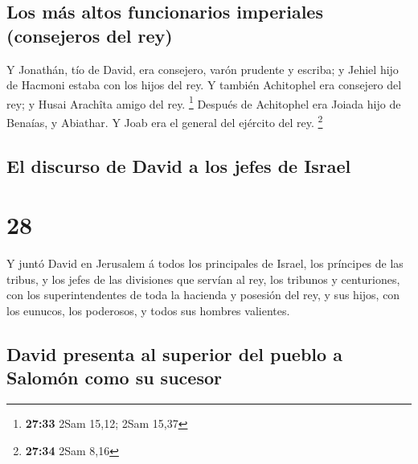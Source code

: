 \hypertarget{los-muxe1s-altos-funcionarios-imperiales-consejeros-del-rey}{%
\subsection{Los más altos funcionarios imperiales (consejeros del
rey)}\label{los-muxe1s-altos-funcionarios-imperiales-consejeros-del-rey}}

 Y Jonathán, tío de David, era consejero, varón prudente
y escriba; y Jehiel hijo de Hacmoni estaba con los hijos del rey.
 Y también Achitophel era consejero del rey; y Husai
Arachîta amigo del rey. \footnote{\textbf{27:33} 2Sam 15,12; 2Sam 15,37}
 Después de Achitophel era Joiada hijo de Benaías, y
Abiathar. Y Joab era el general del ejército del rey. \footnote{\textbf{27:34}
  2Sam 8,16}

\hypertarget{el-discurso-de-david-a-los-jefes-de-israel}{%
\subsection{El discurso de David a los jefes de
Israel}\label{el-discurso-de-david-a-los-jefes-de-israel}}

\hypertarget{section-27}{%
\section{28}\label{section-27}}

 Y juntó David en Jerusalem á todos los principales de
Israel, los príncipes de las tribus, y los jefes de las divisiones que
servían al rey, los tribunos y centuriones, con los superintendentes de
toda la hacienda y posesión del rey, y sus hijos, con los eunucos, los
poderosos, y todos sus hombres valientes.

\hypertarget{david-presenta-al-superior-del-pueblo-a-salomuxf3n-como-su-sucesor}{%
\subsection{David presenta al superior del pueblo a Salomón como su
sucesor}\label{david-presenta-al-superior-del-pueblo-a-salomuxf3n-como-su-sucesor}}

